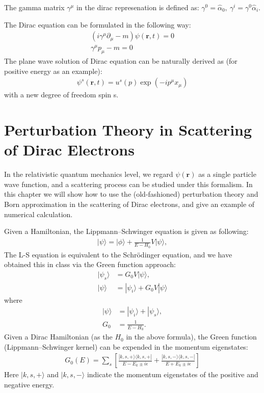 \documentclass{article}
\numberwithin{equation}{section}
\begin{document}
The gamma matrix $\gamma^\mu$ in the dirac represenation is defined as: $\gamma^0=\hat{\alpha}_0,\ \gamma^i=\gamma^0\hat{\alpha}_i$. 

The Dirac equation can be formulated in the following way:
\begin{align}
    (i\gamma^\mu\partial_\mu-m)\psi(\boldsymbol{r},t)=0\\
    \gamma^\mu p_\mu-m=0
\end{align}
The plane wave solution of Dirac equation can be naturally derived as (for positive energy as an example):
\begin{align}
    \psi^s(\boldsymbol{r},t)=u^s(p)\exp(-ip^\mu x_\mu)
\end{align}
with a new degree of freedom spin s.

\section{Perturbation Theory in Scattering of Dirac Electrons}
In the relativistic quantum mechanics level, we regard $\psi(\boldsymbol{r})$ as a single particle wave function, and a scattering process can be studied under this formalism. In this chapter we will show how to use the (old-fashioned) perturbation theory and Born approximation in the scattering of Dirac electrons, and give an example of numerical calculation.

Given a Hamiltonian, the Lippmann–Schwinger equation is given as following:
\begin{align}
    |\psi\rangle = |\phi\rangle + \frac{1}{E - H_0} V |\psi\rangle,
\end{align}
The L-S equation is equivalent to the Schrödinger equation, and we have obtained this in class via the Green function approach:
\begin{align}
    |\psi_s\rangle &= G_0 V |\psi\rangle,\\
    |\psi\rangle &= |\psi_i\rangle +G_0 V |\psi\rangle
\end{align}
where 
\begin{align}
    |\psi\rangle&=|\psi_i\rangle+|\psi_s\rangle,\\
    G_0&=\frac{1}{E-H_0}.
\end{align}
Given a Dirac Hamiltonian (as the $H_0$ in the above formula), the Green function (Lippmann–Schwinger kernel) can be expended in the momentum eigenstates:
\begin{align}
    G_0(E) = \sum_s \left[ 
    \frac{ |k,s,+\rangle \langle k,s,+| }{E - E_k \pm i\epsilon}
    + \frac{ |k,s,-\rangle \langle k,s,-| }{E + E_k \pm i\epsilon}
    \right]
\end{align}
Here $|k,s,+\rangle$ and $|k,s,-\rangle$ indicate the momentum eigenstates of the positive and negative energy. 
\end{document}
